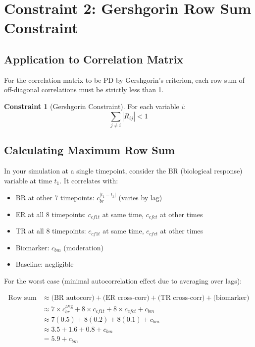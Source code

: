 \documentclass[12pt,a4paper]{article}
\theoremstyle{definition}
\newtheorem{constraint}{Constraint}
\begin{document}
\section{Constraint 2: Gershgorin Row Sum Constraint}

\subsection{Application to Correlation Matrix}

For the correlation matrix to be PD by Gershgorin's criterion, each row sum of off-diagonal correlations must be strictly less than 1.

\begin{constraint}[Gershgorin Constraint]
For each variable $i$:
\[
  \sum_{j \neq i} |R_{ij}| < 1
\]
\end{constraint}

\subsection{Calculating Maximum Row Sum}

In your simulation at a single timepoint, consider the BR (biological response) variable at time $t_1$. It correlates with:

\begin{itemize}
  \item BR at other 7 timepoints: $c_{br}^{|t_1 - t_k|}$ (varies by lag)
  \item ER at all 8 timepoints: $c_{cf1t}$ at same time, $c_{cfct}$ at other times
  \item TR at all 8 timepoints: $c_{cf1t}$ at same time, $c_{cfct}$ at other times
  \item Biomarker: $c_{bm}$ (moderation)
  \item Baseline: negligible
\end{itemize}

For the worst case (minimal autocorrelation effect due to averaging over lags):

\begin{align*}
  \text{Row sum} &\approx \text{(BR autocorr)} + \text{(ER cross-corr)} + \text{(TR cross-corr)} + \text{(biomarker)} \\
  &\approx 7 \times c_{br}^{\text{avg}} + 8 \times c_{cf1t} + 8 \times c_{cfct} + c_{bm} \\
  &\approx 7(0.5) + 8(0.2) + 8(0.1) + c_{bm} \\
  &\approx 3.5 + 1.6 + 0.8 + c_{bm} \\
  &= 5.9 + c_{bm}
\end{align*}
\end{document}
